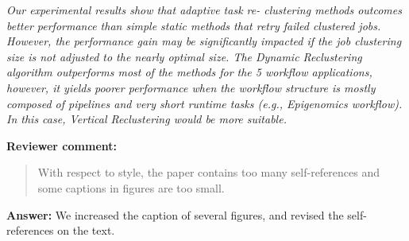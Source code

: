 \documentclass{letter}
\newenvironment{review}%
{\textbf{Reviewer comment:}\begin{quote}}%
{\end{quote}}%
\newcommand{\answer}[1]{%
      \textbf{Answer:} #1}
\newcommand{\revised}[1]{\emph{#1}\color{black}}
\begin{document}
\begin{letter}{}
\revised{Our experimental results show that adaptive task re- clustering methods outcomes better performance than simple static methods that retry failed clustered jobs. However, the performance gain may be significantly impacted if the job clustering size is not adjusted to the nearly optimal size. The Dynamic Reclustering algorithm outperforms most of the methods for the 5 workflow applications, however, it yields poorer performance when the workflow structure is mostly composed of pipelines and very short runtime tasks (e.g., Epigenomics workflow). In this case, Vertical Reclustering would be more suitable.}



\begin{review}
With respect to style, the paper contains too many self-references and some captions in figures are too small.
\end{review}

\answer{We increased the caption of several figures, and revised the self-references on the text.}



\end{letter}
\end{document}
